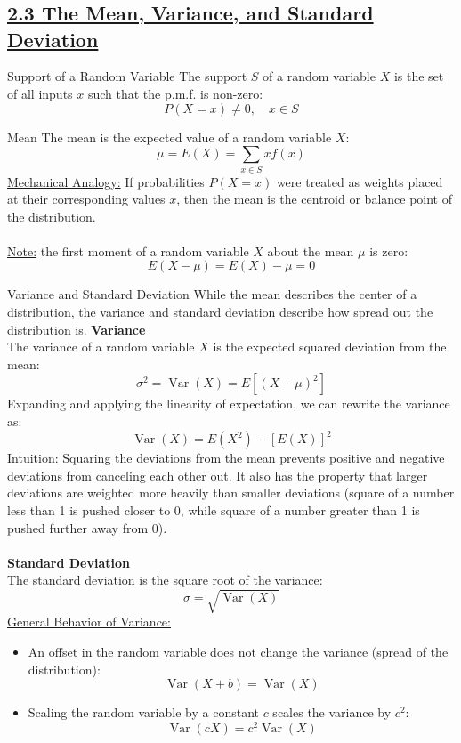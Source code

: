 ﻿\documentclass[12pt]{article}
\begin{document}
\section*{}
\subsection*{\underline{2.3 The Mean, Variance, and Standard Deviation}}
\begin{definition}{Support of a Random Variable}
    The support $S$ of a random variable $X$ is the set of all inputs $x$ such that the p.m.f. is non-zero:
    \[P(X=x) \neq 0,\quad x \in S\]
\end{definition}
\begin{definition}{Mean}
    The mean is the expected value of a random variable $X$:
    \[\mu = E(X) = \sum_{x \in S} x f(x)\]
    \underline{Mechanical Analogy:} If probabilities $P(X=x)$ were treated as weights placed at their corresponding values $x$, then the mean is the centroid or balance point of the distribution.\\\\
    \underline{Note:} the first moment of a random variable $X$ about the mean $\mu$ is zero:
    \[E(X-\mu) = E(X) - \mu = 0\]
\end{definition}
\begin{definition}{Variance and Standard Deviation}
    While the mean describes the center of a distribution, the variance and standard deviation describe how spread out the distribution is.
    \newpage
    \textbf{Variance}\\
    The variance of a random variable $X$ is the expected squared deviation from the mean:
    \[
\boxed{\sigma^2=\operatorname{Var}(X)=E[(X-\mu)^2]}
\]
Expanding and applying the linearity of expectation, we can rewrite the variance as:
\[\boxed{\operatorname{Var}(X) = E(X^2) - [E(X)]^2}\]
\underline{Intuition:} Squaring the deviations from the mean prevents positive and negative deviations from canceling each other out. It also has the property that larger deviations are weighted more heavily than smaller deviations (square of a number less than 1 is pushed closer to 0, while square of a number greater than 1 is pushed further away from 0).\\\\
\textbf{Standard Deviation}\\
The standard deviation is the square root of the variance:
\[\boxed{\sigma = \sqrt{\operatorname{Var}(X)}}\]
\underline{General Behavior of Variance:}
\begin{itemize}
    \item An offset in the random variable does not change the variance (spread of the distribution): $$\operatorname{Var}(X+b) = \operatorname{Var}(X)$$
    \item Scaling the random variable by a constant $c$ scales the variance by $c^2$: $$\operatorname{Var}(cX) = c^2\operatorname{Var}(X)$$
\end{itemize}
\end{definition}
\end{document}
